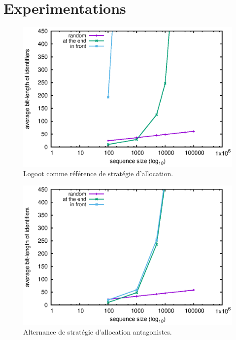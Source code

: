 
\section{Experimentations}

\begin{figure}
  \centering
  \includegraphics{./img/logoot.eps}
  \caption{\label{fig:logoot}Logoot comme référence de stratégie d'allocation.}
\end{figure}

\begin{figure}
  \centering
  \includegraphics{./img/robin.eps}
  \caption{\label{fig:logoot}Alternance de stratégie d'allocation antagonistes.}
\end{figure}

